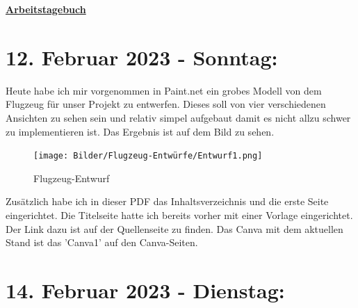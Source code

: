 \documentclass[a4paper, 10pt, oneside]{article} %
\begin{document}



\newpage


\huge{\underline{\textbf{Arbeitstagebuch}}}
\newline

\section*{12. Februar 2023 - Sonntag:}


\begin{normalsize}
\begin{spacing}{1}

Heute habe ich mir vorgenommen in Paint.net ein grobes Modell von dem Flugzeug für unser Projekt zu entwerfen. Dieses soll von vier verschiedenen Ansichten zu sehen sein und relativ simpel aufgebaut damit es nicht allzu schwer zu implementieren ist. Das Ergebnis ist auf dem Bild zu sehen.

\begin{figure}[h]
 \centering
 \texttt{[image: Bilder/Flugzeug-Entwürfe/Entwurf1.png]}
 \caption{Flugzeug-Entwurf}
\end{figure}

Zusätzlich habe ich in dieser PDF das Inhaltsverzeichnis und die erste Seite eingerichtet. Die Titelseite hatte ich bereits vorher mit einer Vorlage eingerichtet. Der Link dazu ist auf der Quellenseite zu finden. Das Canva mit dem aktuellen Stand ist das 'Canva1' auf den Canva-Seiten.


\end{spacing}
\end{normalsize}



\section*{14. Februar 2023 - Dienstag:}
\end{document}
